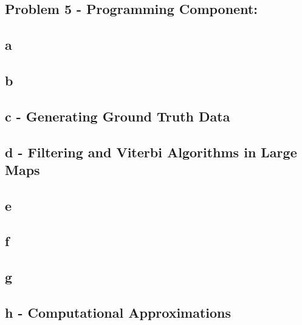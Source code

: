 \documentclass[11pt, oneside]{article}   	%
\begin{document}
\begin{flushleft}
\section*{Problem 5 - Programming Component:}
\subsection*{a}
\subsection*{b}
\subsection*{c - Generating Ground Truth Data}
\subsection*{d - Filtering and Viterbi Algorithms in Large Maps}
\subsection*{e}
\subsection*{f}
\subsection*{g}
\subsection*{h - Computational Approximations}
\end{flushleft}
\end{document}

